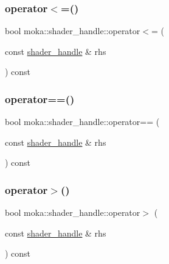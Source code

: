 \subsubsection{\texorpdfstring{operator$<$=()}{operator<=()}}
{\footnotesize\ttfamily bool moka\+::shader\+\_\+handle\+::operator$<$= (\begin{DoxyParamCaption}\item[{const \mbox{\hyperlink{structmoka_1_1shader__handle}{shader\+\_\+handle}} \&}]{rhs }\end{DoxyParamCaption}) const\hspace{0.3cm}{\ttfamily [inline]}}

\mbox{\label{structmoka_1_1shader__handle_a96891cd7aa94766a22b5caa913387551}} 
\subsubsection{\texorpdfstring{operator==()}{operator==()}}
{\footnotesize\ttfamily bool moka\+::shader\+\_\+handle\+::operator== (\begin{DoxyParamCaption}\item[{const \mbox{\hyperlink{structmoka_1_1shader__handle}{shader\+\_\+handle}} \&}]{rhs }\end{DoxyParamCaption}) const\hspace{0.3cm}{\ttfamily [inline]}}

\mbox{\label{structmoka_1_1shader__handle_a4cc2bab1d2c0ddc054bf659b7541200c}} 
\subsubsection{\texorpdfstring{operator$>$()}{operator>()}}
{\footnotesize\ttfamily bool moka\+::shader\+\_\+handle\+::operator$>$ (\begin{DoxyParamCaption}\item[{const \mbox{\hyperlink{structmoka_1_1shader__handle}{shader\+\_\+handle}} \&}]{rhs }\end{DoxyParamCaption}) const\hspace{0.3cm}{\ttfamily [inline]}}

